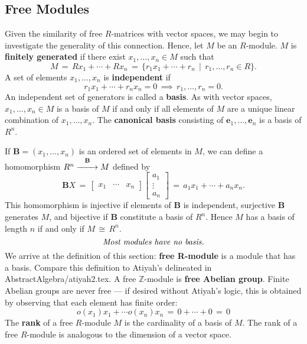 \documentclass[11pt]{article}
\renewcommand{\longrightarrow}{\xrightarrow{\hspace*{0.7cm}}}
\renewcommand{\vec}[1]{\mathbf{#1}}
\begin{document}

\subsection{Free Modules}

Given the similarity of free $R$-matrices with vector spaces, we may begin to investigate the generality of this connection. Hence, let $M$ be an $R$-module. $M$ is \textbf{finitely generated} if there exist $x_{1}, \ldots, x_{n} \in M$ such that
\[
  M \, = \, Rx_{1} + \cdots + Rx_{n} \, = \, \{ r_{1}x_{1} + \cdots + r_{n} \, \mid \, r_{1}, \ldots, r_{n} \in R \}.
\]
A set of elements $x_{1}, \ldots, x_{n}$ is \textbf{independent} if
\[
  r_{1}x_{1} + \cdots + r_{n}x_{n} = 0 \, \implies \, r_{1}, \ldots, r_{n} = 0.
\]
An independent set of generators is called a \textbf{basis}. As with vector spaces, $x_{1}, \ldots, x_{n} \in M$ is a basis of $M$ if and only if all elements of $M$ are a unique linear combination of $x_{1}, \ldots, x_{n}$. The \textbf{canonical basis} consisting of $\vec{e}_{1}, \ldots, \vec{e}_{n}$ is a basis of $R^{n}$.

\newpage

If $\vec{B} = (x_{1}, \ldots, x_{n})$ is an ordered set of elements in $M$, we can define a homomorphism $R^{n} \stackrel{\vec{B}}{\longrightarrow} M$ defined by
\[
  \vec{B}X \, = \, \begin{bmatrix} x_{1} & \cdots & x_{n} \end{bmatrix} \begin{bmatrix} a_{1} \\ \vdots \\ a_{n} \end{bmatrix} \, = \, a_{1}x_{1} + \cdots + a_{n}x_{n}.
\]
This homomorphism is injective if elements of $\vec{B}$ is independent, surjective $\vec{B}$ generates $M$, and bijective if $\vec{B}$ constitute a basis of $R^{n}$. Hence $M$ has a basis of length $n$ if and only if $M \, \cong \, R^{n}$. 
\[
  \text{\textit{Most modules have no basis.}}
\]
We arrive at the definition of this section: \textbf{free R-module} is a module that has a basis. Compare this definition to Atiyah's delineated in AbstractAlgebra/atiyah2.tex. A free $\mathbb{Z}$-module is \textbf{free Abelian group}. Finite Abelian groups are never free --- if desired without Atiyah's logic, this is obtained by observing that each element has finite order:
\[
  o(x_{1}) x_{1} + \cdots o(x_{n}) x_{n} \, = \, 0 + \cdots + 0 \, = \, 0
\]
The \textbf{rank} of a free $R$-module $M$ is the cardinality of a basis of $M$. The rank of a free $R$-module is analogous to the dimension of a vector space.
\end{document}
